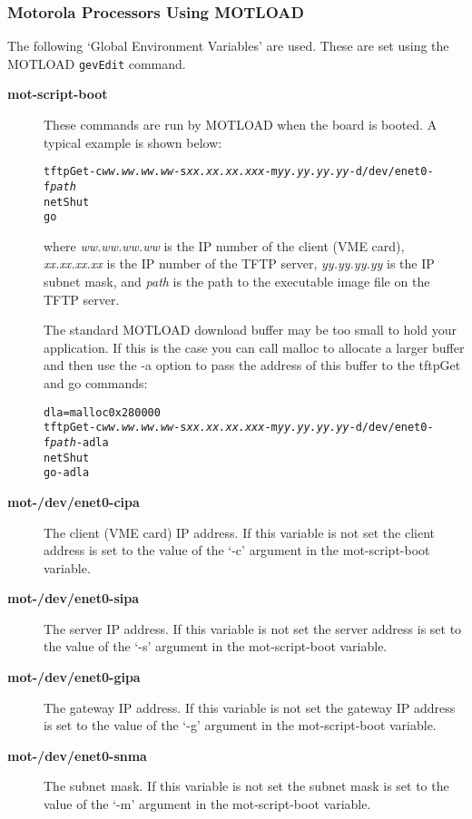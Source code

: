 \documentclass{report}
\begin{document}
\subsubsection{Motorola Processors Using MOTLOAD}
\label{MOTLOAD}
The following `Global Environment Variables' are used.  These are set using
the MOTLOAD {\tt gevEdit} command.
\begin{description}
\item[{\bf mot-script-boot}]
These commands are run by MOTLOAD when the board is booted.  A typical example is shown below:
\begin{alltt}
tftpGet -c\textit{ww.ww.ww.ww} -s\textit{xx.xx.xx.xxx} -m\textit{yy.yy.yy.yy} -d/dev/enet0 -f\textit{path}
netShut
go
\end{alltt}
where {\it ww.ww.ww.ww} is the IP number of the client (VME card),
{\it xx.xx.xx.xx} is the IP number of the TFTP server,
{\it yy.yy.yy.yy} is the IP subnet mask, and
{\it path} is the path to the executable image file on the TFTP server.

The standard MOTLOAD download buffer may be too small to hold your application.  If this is the
case you can call malloc to allocate a larger buffer and then use the -a option to pass the address of this buffer to the tftpGet and go commands:
\begin{alltt}
dla=malloc 0x280000
tftpGet -c\textit{ww.ww.ww.ww} -s\textit{xx.xx.xx.xxx} -m\textit{yy.yy.yy.yy} -d/dev/enet0 -f\textit{path} -adla
netShut
go -adla
\end{alltt}


\item[{\bf mot-/dev/enet0-cipa}]
The client (VME card) IP address.  If this variable is not set the client address is 
set to the value of the `-c' argument in the mot-script-boot variable.

\item[{\bf mot-/dev/enet0-sipa}]
The server IP address.  If this variable is not set the server address is 
set to the value of the `-s' argument in the mot-script-boot variable.

\item[{\bf mot-/dev/enet0-gipa}]
The gateway IP address.  If this variable is not set the gateway IP address is 
set to the value of the `-g' argument in the mot-script-boot variable.

\item[{\bf mot-/dev/enet0-snma}]
The subnet mask.  If this variable is not set the subnet mask is 
set to the value of the `-m' argument in the mot-script-boot variable.


\end{description}
\end{document}
